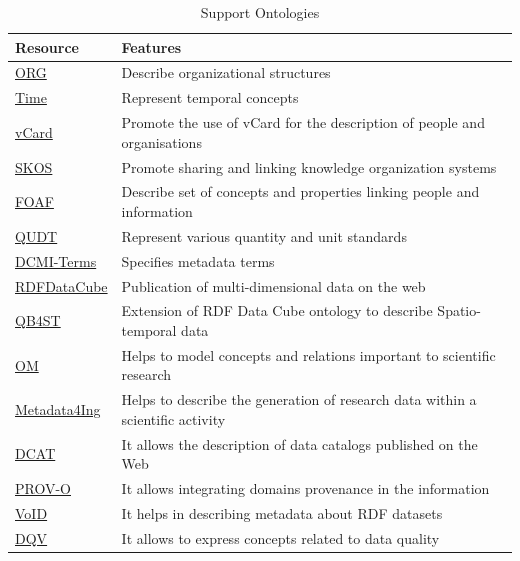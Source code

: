 \documentclass{guideline/sty/rapport}
\begin{document}
\begin{table}[H]
	\centering
	\begin{tabular}{ll}
		\hline
		\rowcolor{oceanboatblue!20} 
		\textbf{Resource} & \textbf{Features} \\
		\hline
\href{https://www.w3.org/TR/vocab-org/}{ORG} & Describe organizational structures \\ 
\href{https://www.w3.org/TR/owl-time/}{Time} & Represent temporal concepts \\ 
\href{https://www.w3.org/TR/vcard-RDF/}{vCard} & Promote the use of vCard for the description of people and organisations  \\ 
\href{https://www.w3.org/2009/08/skos-reference/skos.html}{SKOS} & Promote sharing and linking knowledge organization systems \\ 
\href{http://xmlns.com/foaf/spec/}{FOAF} & Describe set of concepts and properties linking people and information\\ 
\href{https://www.qudt.org}{QUDT} & Represent various quantity and unit standards \\
\href{https://www.dublincore.org/specifications/dublin-core/dcmi-terms/}{DCMI-Terms} & Specifies metadata terms \\
\href{https://www.w3.org/TR/vocab-data-cube/}{RDFDataCube} & Publication of multi-dimensional data on the web \\ 
\href{https://www.w3.org/TR/qb4st/}{QB4ST} & Extension of RDF Data Cube ontology to describe Spatio-temporal data \\ 
\href{https://github.com/HajoRijgersberg/OM}{OM} & Helps to model concepts and relations important to scientific research \\
\href{https://nfdi4ing.pages.rwth-aachen.de/metadata4ing/metadata4ing/index.html#}{Metadata4Ing} & Helps to describe the generation of research data within a scientific activity \\
\href{https://www.w3.org/TR/vocab-dcat-2/}{DCAT} & It allows the description of data catalogs published on the Web \\
\href{https://www.w3.org/TR/prov-o/}{PROV-O} & It allows integrating domains provenance in the information \\
\href{https://www.w3.org/TR/void/}{VoID} & It helps in describing metadata about RDF datasets \\
\href{https://www.w3.org/TR/vocab-dqv/}{DQV} & It allows to express concepts related to data quality \\
\hline
\end{tabular}
\caption{Support Ontologies} 
\label{tab:currentsupportontologies}
\end{table}
\end{document}
